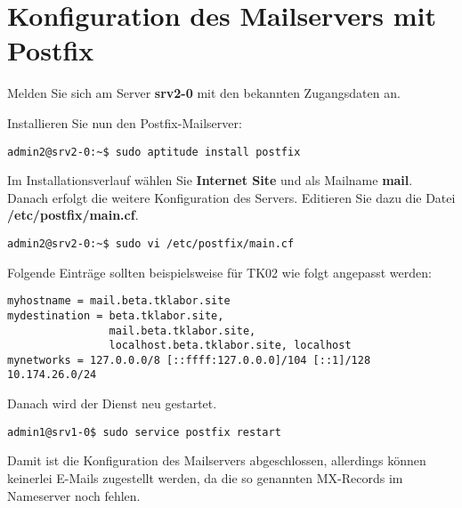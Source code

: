 \section{Konfiguration des Mailservers mit Postfix}

Melden Sie sich am Server \textbf{srv2-0} mit den bekannten Zugangsdaten an. 

Installieren Sie nun den Postfix-Mailserver:
\begin{lstlisting}
admin2@srv2-0:~$ sudo aptitude install postfix
\end{lstlisting}
Im Installationsverlauf wählen Sie \textbf{Internet Site} und als Mailname \textbf{mail}. Danach erfolgt die weitere Konfiguration 
des Servers. Editieren Sie dazu die Datei \textbf{/etc/postfix/main.cf}.

\begin{lstlisting}
admin2@srv2-0:~$ sudo vi /etc/postfix/main.cf
\end{lstlisting}
Folgende Einträge sollten beispielsweise für TK02 wie folgt angepasst werden:
\begin{lstlisting}
myhostname = mail.beta.tklabor.site
mydestination = beta.tklabor.site, 
                mail.beta.tklabor.site, 
                localhost.beta.tklabor.site, localhost
mynetworks = 127.0.0.0/8 [::ffff:127.0.0.0]/104 [::1]/128 10.174.26.0/24
\end{lstlisting}
Danach wird der Dienst neu gestartet.
\begin{lstlisting}
admin1@srv1-0$ sudo service postfix restart
\end{lstlisting}
Damit ist die Konfiguration des Mailservers abgeschlossen, allerdings können keinerlei E-Mails zugestellt werden, da die so genannten MX-Records im Nameserver noch fehlen.

